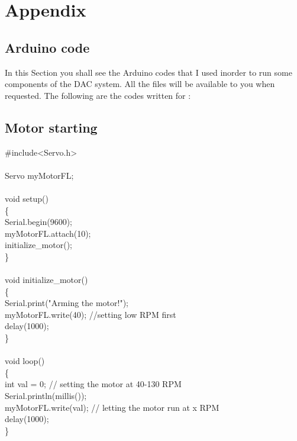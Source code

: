 
\section{Appendix}
\begin{appendices}


\section{Arduino code}
\label{ap:arduino}

In this Section you shall see the Arduino codes that I used inorder to run some components of the DAC system. All the files will be available to you when requested. The following are the codes written for :

\subsection{Motor starting}
{\selectfont
\#include<Servo.h> \\
\\
Servo myMotorFL; \\
\\
void setup() \\
\{ \\
 Serial.begin(9600); \\
 myMotorFL.attach(10); \\
 initialize\_motor(); \\
\} \\
\\ 
void initialize\_motor() \\
\{ \\
 Serial.print("Arming the motor!"); \\
 myMotorFL.write(40); //setting low RPM first \\
 delay(1000); \\
\} \\
\\
void loop() \\
\{  \\
  int val = 0;    // setting the motor at 40-130 RPM \\
  Serial.println(millis()); \\        
  myMotorFL.write(val); // letting the motor run at x RPM \\
  delay(1000); \\
\} \\
} \\


\end{appendices}
